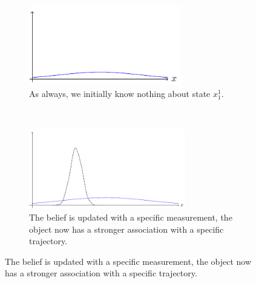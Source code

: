 \begin{figure}[!ht]
    \centering
    \begin{subfigure}[t]{0.5\textwidth}
        \centering
        \includegraphics[height=3.5cm]{tikz/prior}
        \caption{As always, we initially know nothing about state $x_1^{1}$.}
    \end{subfigure}%
    ~
    \begin{subfigure}[t]{0.5\textwidth}
        \centering
        \includegraphics[height=3.5cm]{tikz/prior_measurement}
        \caption{The belief is updated with a specific measurement, the object now has a stronger association with a specific trajectory.}
    \end{subfigure}%
    

\end{figure}
